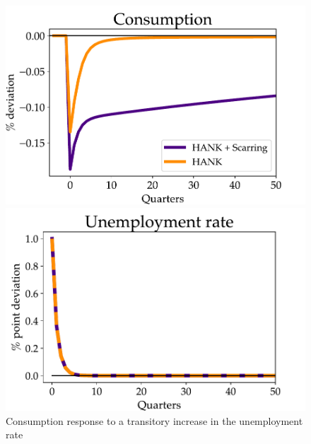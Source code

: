 \begin{figure}[H]
    \centering
   \begin{minipage}{0.49\textwidth}
        \centering
        \includegraphics[width=1.1\textwidth]{text/chapter1/Figures/CJAC_JF_real_comparison} 
    \end{minipage}\hfill
    \begin{minipage}{0.49\textwidth}
        \centering
        \includegraphics[width=1.1\textwidth]{text/chapter1/Figures/Urate_response_PE}
    \end{minipage}
    \caption{Consumption response to a transitory increase in the unemployment rate}
    \label{Micro_results}
\end{figure}





